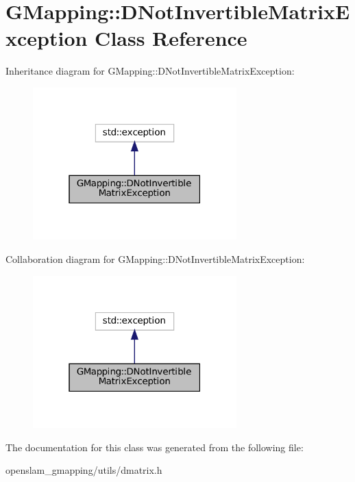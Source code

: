 \hypertarget{classGMapping_1_1DNotInvertibleMatrixException}{}\section{G\+Mapping\+:\+:D\+Not\+Invertible\+Matrix\+Exception Class Reference}
\label{classGMapping_1_1DNotInvertibleMatrixException}


Inheritance diagram for G\+Mapping\+:\+:D\+Not\+Invertible\+Matrix\+Exception\+:
\nopagebreak
\begin{figure}[H]
\begin{center}
\leavevmode
\includegraphics[width=223pt]{classGMapping_1_1DNotInvertibleMatrixException__inherit__graph}
\end{center}
\end{figure}


Collaboration diagram for G\+Mapping\+:\+:D\+Not\+Invertible\+Matrix\+Exception\+:
\nopagebreak
\begin{figure}[H]
\begin{center}
\leavevmode
\includegraphics[width=223pt]{classGMapping_1_1DNotInvertibleMatrixException__coll__graph}
\end{center}
\end{figure}


The documentation for this class was generated from the following file\+:\begin{DoxyCompactItemize}
\item 
openslam\+\_\+gmapping/utils/dmatrix.\+h\end{DoxyCompactItemize}
